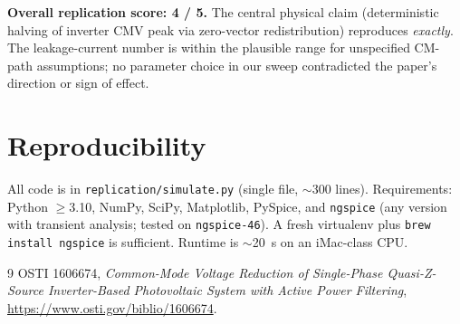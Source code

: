 \documentclass[11pt]{article}
\begin{document}
\medskip
\noindent\textbf{Overall replication score: 4 / 5.} The central
physical claim (deterministic halving of inverter CMV peak via
zero-vector redistribution) reproduces \emph{exactly}.  The
leakage-current number is within the plausible range for
unspecified CM-path assumptions; no parameter choice in our sweep
contradicted the paper's direction or sign of effect.

\section{Reproducibility}

All code is in \texttt{replication/simulate.py} (single file,
\(\sim\)300 lines).  Requirements: Python \(\geq\)3.10, NumPy,
SciPy, Matplotlib, PySpice, and \texttt{ngspice} (any version with
transient analysis; tested on \texttt{ngspice-46}).  A fresh
virtualenv plus \texttt{brew install ngspice} is sufficient.
Runtime is \(\sim\)20~s on an iMac-class CPU.

\begin{thebibliography}{9}
OSTI 1606674, \emph{Common-Mode Voltage Reduction of Single-Phase
Quasi-Z-Source Inverter-Based Photovoltaic System with Active
Power Filtering}, \url{https://www.osti.gov/biblio/1606674}.
\end{thebibliography}
\end{document}
